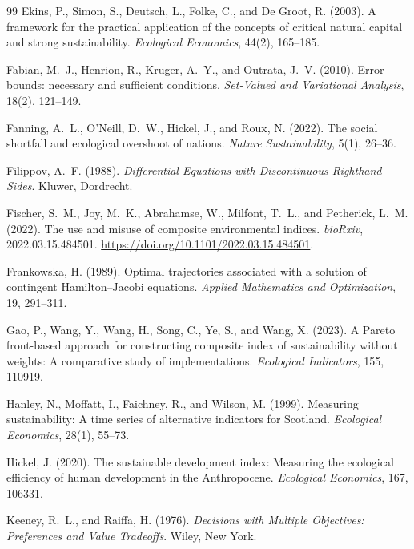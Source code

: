 \begin{thebibliography}{99}
 Ekins, P., Simon, S., Deutsch, L., Folke, C., and De Groot, R. (2003). A framework for the practical application of the concepts of critical natural capital and strong sustainability. \emph{Ecological Economics}, 44(2), 165--185.

 Fabian, M.~J., Henrion, R., Kruger, A.~Y., and Outrata, J.~V. (2010). Error bounds: necessary and sufficient conditions. \emph{Set-Valued and Variational Analysis}, 18(2), 121--149.

 Fanning, A.~L., O'Neill, D.~W., Hickel, J., and Roux, N. (2022). The social shortfall and ecological overshoot of nations. \emph{Nature Sustainability}, 5(1), 26--36.

 Filippov, A.~F. (1988). \emph{Differential Equations with Discontinuous Righthand Sides}. Kluwer, Dordrecht.

 Fischer, S.~M., Joy, M.~K., Abrahamse, W., Milfont, T.~L., and Petherick, L.~M. (2022). The use and misuse of composite environmental indices. \emph{bioRxiv}, 2022.03.15.484501. \url{https://doi.org/10.1101/2022.03.15.484501}.

 Frankowska, H. (1989). Optimal trajectories associated with a solution of contingent Hamilton--Jacobi equations. \emph{Applied Mathematics and Optimization}, 19, 291--311.

 Gao, P., Wang, Y., Wang, H., Song, C., Ye, S., and Wang, X. (2023). A Pareto front-based approach for constructing composite index of sustainability without weights: A comparative study of implementations. \emph{Ecological Indicators}, 155, 110919.

 Hanley, N., Moffatt, I., Faichney, R., and Wilson, M. (1999). Measuring sustainability: A time series of alternative indicators for Scotland. \emph{Ecological Economics}, 28(1), 55--73.

 Hickel, J. (2020). The sustainable development index: Measuring the ecological efficiency of human development in the Anthropocene. \emph{Ecological Economics}, 167, 106331.

 Keeney, R.~L., and Raiffa, H. (1976). \emph{Decisions with Multiple Objectives: Preferences and Value Tradeoffs}. Wiley, New York.


\end{thebibliography}
